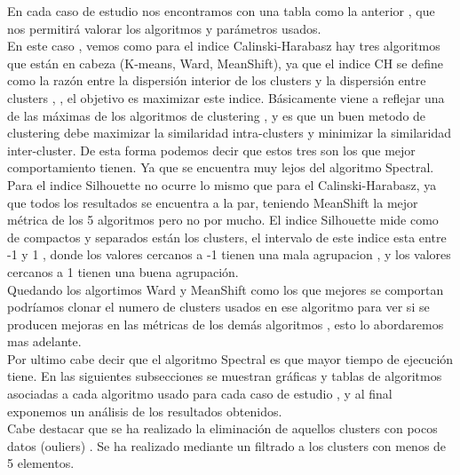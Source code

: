 	En cada caso de estudio nos encontramos con una tabla como la anterior , que nos permitirá valorar 
	los algoritmos y parámetros usados. \\

	En este caso , vemos como para el indice Calinski-Harabasz hay tres algoritmos que están en cabeza (K-means, Ward, MeanShift), ya que 
	el indice CH se define como la razón entre la dispersión interior de los clusters y la dispersión entre clusters , 
	, el objetivo es maximizar este indice. Básicamente viene a reflejar una de las máximas de los algoritmos de clustering
	, y es que un buen metodo de clustering debe maximizar la similaridad intra-clusters y minimizar la similaridad
	inter-cluster. De esta forma podemos decir que estos tres son los que mejor comportamiento tienen. Ya que se encuentra muy lejos del algoritmo
	Spectral. \\

	Para el indice Silhouette no ocurre lo mismo que para el Calinski-Harabasz, ya que todos los resultados se encuentra a la par,
	teniendo MeanShift la mejor métrica de los
	5 algoritmos pero no por mucho. El indice Silhouette mide como de compactos y separados están los clusters, el intervalo de este 
	indice esta entre -1 y 1 , donde los valores cercanos a -1 tienen una mala agrupacion , y los valores cercanos a 1 
	tienen una buena agrupación.\\
	
	Quedando los algortimos Ward y MeanShift como los que mejores se comportan podríamos clonar el numero de clusters usados en ese algoritmo 
	para ver si se producen mejoras en las métricas de los demás algoritmos , esto lo abordaremos mas adelante.\\

	Por ultimo cabe decir que el algoritmo Spectral es que mayor tiempo de ejecución tiene. En las siguientes subsecciones
	se muestran gráficas y tablas de algoritmos asociadas a cada algoritmo usado para cada caso de estudio
	, y al final exponemos un análisis de los resultados obtenidos.\\

	Cabe destacar que se ha realizado la eliminación de aquellos clusters con pocos datos (ouliers) . Se ha realizado mediante un 
	filtrado a los clusters con menos de 5 elementos. \\


